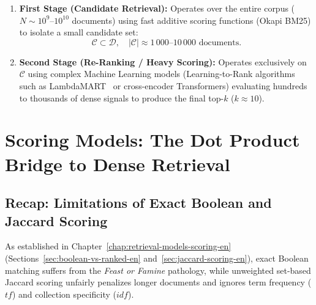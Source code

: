 \begin{enumerate}
    \item \textbf{First Stage (Candidate Retrieval):} Operates over the entire corpus ($N \sim 10^9\text{--}10^{10}$ documents) using fast additive scoring functions (Okapi BM25) to isolate a small candidate set:
    \begin{equation}
    \mathcal{C} \subset \mathcal{D}, \quad |\mathcal{C}| \approx 1\,000 \text{--} 10\,000 \text{ documents}.
    \end{equation}
    \item \textbf{Second Stage (Re-Ranking / Heavy Scoring):} Operates exclusively on $\mathcal{C}$ using complex Machine Learning models (Learning-to-Rank algorithms such as LambdaMART~\cite{burges2010} or cross-encoder Transformers) evaluating hundreds to thousands of dense signals to produce the final top-$k$ ($k \approx 10$).
\end{enumerate}

\FloatBarrier
\section{Scoring Models: The Dot Product Bridge to Dense Retrieval}
\label{sec:scoring-bridge-en}

\subsection{Recap: Limitations of Exact Boolean and Jaccard Scoring}
As established in Chapter~\ref{chap:retrieval-models-scoring-en} (Sections~\ref{sec:boolean-vs-ranked-en} and~\ref{sec:jaccard-scoring-en}), exact Boolean matching suffers from the \textit{Feast or Famine} pathology, while unweighted set-based Jaccard scoring unfairly penalizes longer documents and ignores term frequency ($tf$) and collection specificity ($idf$).


